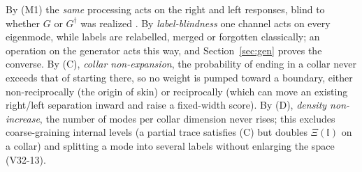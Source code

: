 \documentclass[11pt]{article}
\theoremstyle{definition}
\theoremstyle{remark}
\newcommand{\one}{\mathbb{I}}
\begin{document}
By (M1) the \emph{same} processing acts on the right and left responses, blind to whether $G$ or $G^\dagger$ was realized \cite{WW19}. By \emph{label-blindness} one channel acts on every eigenmode, while labels are relabelled, merged or forgotten classically; an operation on the generator acts this way, and Section~\ref{sec:gen} proves the converse. By (C), \emph{collar non-expansion}, the probability of ending in a collar never exceeds that of starting there, so no weight is pumped toward a boundary, either non-reciprocally (the origin of skin) or reciprocally (which can move an existing right/left separation inward and raise a fixed-width score). By (D), \emph{density non-increase}, the number of modes per collar dimension never rises; this excludes coarse-graining internal levels (a partial trace satisfies (C) but doubles $\Xi(\one)$ on a collar) and splitting a mode into several labels without enlarging the space (V32-13).
\end{document}
